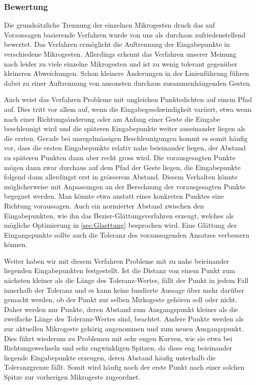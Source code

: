 \subsubsection{Bewertung}

Die grundsätzliche Trennung der einzelnen Mikrogesten druch das auf Voraussagen basierende Verfahren wurde von uns als durchaus zufriedenstellend bewertet. Das Verfahren ermöglicht die Auftrennung der Eingabepunkte in verschiedene Mikrogesten. Allerdings erkennt das Verfahren unserer Meinung nach leider zu viele einzelne Mikrogesten und ist zu wenig tolerant gegenüber kleineren Abweichungen. Schon kleinere Änderungen in der Linienführung führen dabei zu einer Auftrennung von ansonsten durchaus zusammenhängenden Gesten.

Auch weist das Verfahren Probleme mit ungleichen Punktedichten auf einem Pfad auf. Dies tritt vor allem auf, wenn die Eingabegeschwindigkeit variiert, etwa wenn nach einer Richtungsänderung oder am Anfang einer Geste die Eingabe beschleunigt wird und die späteren Eingabepunkte weiter auseinander liegen als die ersten. Gerade bei unregelmässigen Beschleunigungen kommt es somit häufig vor, dass die ersten Eingabepunkte relativ nahe beieinander liegen, der Abstand zu späteren Punkten dann aber recht gross wird. Die vorausgesagten Punkte mögen dann zwar durchaus auf dem Pfad der Geste liegen, die Eingabepunkte folgend dann allerdingst erst in grösserem Abstand. Diesem Verhalten könnte möglicherweise mit Anpassungen an der Berechnung der vorausgesagten Punkte begegnet werden. Man könnte etwa anstatt eines konkreten Punktes eine Richtung voraussagen. Auch ein normierter Abstand zwischen den Eingabepunkten, wie ihn das Bezier-Glättungsverfahren erzeugt, welches als mögliche Optimierung in \ref{sec:Glaettung} besprochen wird. Eine Glättung der Eingangspunkte sollte auch die Toleranz des voraussagenden Ansatzes verbessern können.

Weiter haben wir mit diesem Verfahren Probleme mit zu nahe beieinander liegenden Eingabepunkten festgestellt. Ist die Distanz von einem Punkt zum nächsten kleiner als die Länge des Toleranz-Wertes, fällt der Punkt in jedem Fall innerhalb der Toleranz und es kann keine fundierte Aussage über mehr darüber gemacht werden, ob der Punkt zur selben Mirkogeste gehören soll oder nicht. Daher werden nur Punkte, deren Abstand zum Ausgangspunkt kleiner als die zweifache Länge des Toleranz-Wertes sind, beachtet. Andere Punkte werden als zur aktuellen Mikrogeste gehörig angenommen und zum neuen Ausgangspunkt. Dies führt wiederum zu Problemen mit sehr engen Kurven, wie sie etwa bei Richtungswechseln und sehr engwinkligen Spitzen, da diese eng beieinander liegende Eingabepunkte erzeugen, deren Abstand häufig unterhalb die Toleranzgrenze fällt. Somit wird häufig noch der erste Punkt nach einer solchen Spitze zur vorherigen Mikrogeste zugeordnet.

